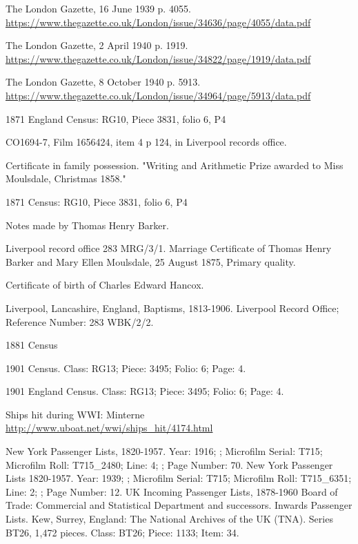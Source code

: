 \begin{thebibliography}{99}
	The London Gazette, 16 June 1939 p. 4055.
	\url{https://www.thegazette.co.uk/London/issue/34636/page/4055/data.pdf}

	The London Gazette, 2 April 1940 p. 1919.
	\url{https://www.thegazette.co.uk/London/issue/34822/page/1919/data.pdf}

	The London Gazette, 8 October 1940 p. 5913.
	\url{https://www.thegazette.co.uk/London/issue/34964/page/5913/data.pdf}

	1871 England Census: RG10, Piece 3831, folio 6, P4

	CO1694-7, Film 1656424, item 4 p 124, in Liverpool records office.

	Certificate in family possession.
	"Writing and Arithmetic Prize awarded to Miss Moulsdale, Christmas 1858."

	1871 Census: RG10, Piece 3831, folio 6, P4

	Notes made by Thomas Henry Barker.

	Liverpool record office 283 MRG/3/1.
	Marriage Certificate of Thomas Henry Barker and Mary Ellen Moulsdale, 25 August 1875, Primary quality.

	Certificate of birth of Charles Edward Hancox.


	Liverpool, Lancashire, England, Baptisms, 1813-1906.
	Liverpool Record Office; Reference Number: 283 WBK/2/2.

	1881 Census

	1901 Census.
	Class: RG13; Piece: 3495; Folio: 6; Page: 4.

	1901 England Census.
	Class: RG13; Piece: 3495; Folio: 6; Page: 4.

	Ships hit during WWI: Minterne
	\url{http://www.uboat.net/wwi/ships_hit/4174.html}

	New York Passenger Lists, 1820-1957.
	Year: 1916; ; Microfilm Serial: T715; Microfilm Roll: T715\_2480; Line: 4; ; Page Number: 70.
	New York Passenger Lists 1820-1957.
	Year: 1939; ; Microfilm Serial: T715; Microfilm Roll: T715\_6351; Line: 2; ; Page Number: 12.
	UK Incoming Passenger Lists, 1878-1960 Board of Trade: Commercial and Statistical Department and successors.
	Inwards Passenger Lists. Kew, Surrey, England: The National Archives of the UK (TNA).
	Series BT26, 1,472 pieces. Class: BT26; Piece: 1133; Item: 34.


\end{thebibliography}
